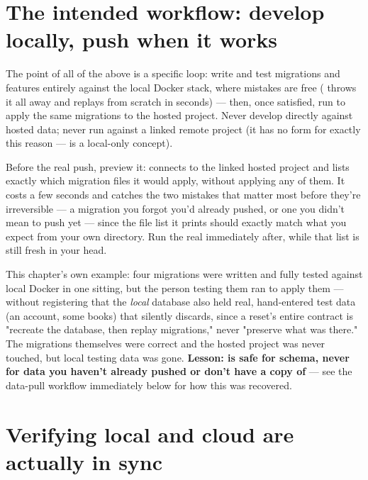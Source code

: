 \section{The intended workflow: develop locally, push when it works}
\label{sec:workflow}

The point of all of the above is a specific loop: write and test migrations and features entirely against the local Docker stack, where mistakes are free ( throws it all away and replays from scratch in seconds) — then, once satisfied, run  to apply the same migrations to the hosted project. Never develop directly against hosted data; never run  against a linked remote project (it has no  form for exactly this reason —  is a local-only concept).

\begin{olktip}
Before the real push, preview it:  connects to the linked hosted project and lists exactly which migration files it would apply, without applying any of them. It costs a few seconds and catches the two mistakes that matter most before they're irreversible — a migration you forgot you'd already pushed, or one you didn't mean to push yet — since the file list it prints should exactly match what you expect from your own  directory. Run the real  immediately after, while that list is still fresh in your head.
\end{olktip}

\begin{olkgotcha}
This chapter's own example: four migrations were written and fully tested against local Docker in one sitting, but the person testing them ran  to apply them — without registering that the \emph{local} database also held real, hand-entered test data (an account, some books) that  silently discards, since a reset's entire contract is "recreate the database, then replay migrations," never "preserve what was there." The migrations themselves were correct and the hosted project was never touched, but local testing data was gone. \textbf{Lesson:  is safe for schema, never for data you haven't already pushed or don't have a copy of} — see the data-pull workflow immediately below for how this was recovered.
\end{olkgotcha}

\section{Verifying local and cloud are actually in sync}


